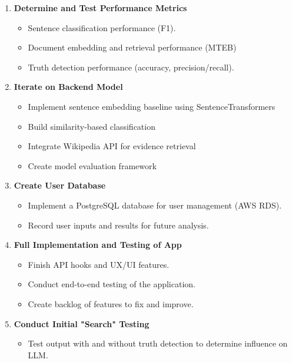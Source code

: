 \documentclass[11pt,letterpaper]{article}
\begin{document}
{\begin{enumerate}[label=\textbf{Week \arabic*:}]
    \item \textbf{Determine and Test Performance Metrics}
        \begin{itemize}
            \item Sentence classification performance (F1).
            \item Document embedding and retrieval performance (MTEB)
            \item Truth detection performance (accuracy, precision/recall).
        \end{itemize}

    \item \textbf{Iterate on Backend Model}
        \begin{itemize}
            \item Implement sentence embedding baseline using SentenceTransformers
            \item Build similarity-based classification
            \item Integrate Wikipedia API for evidence retrieval
            \item Create model evaluation framework
        \end{itemize}

    \item \textbf{Create User Database}
        \begin{itemize}
            \item Implement a PostgreSQL database for user management (AWS RDS).
            \item Record user inputs and results for future analysis.
        \end{itemize}

    \item \textbf{Full Implementation and Testing of App}
        \begin{itemize}
            \item Finish API hooks and UX/UI features.
            \item Conduct end-to-end testing of the application.
            \item Create backlog of features to fix and improve.
        \end{itemize}

    \item \textbf{Conduct Initial "Search" Testing}
        \begin{itemize}
            \item Test output with and without truth detection to determine influence on LLM.
        \end{itemize}


\end{enumerate}}
\end{document}
